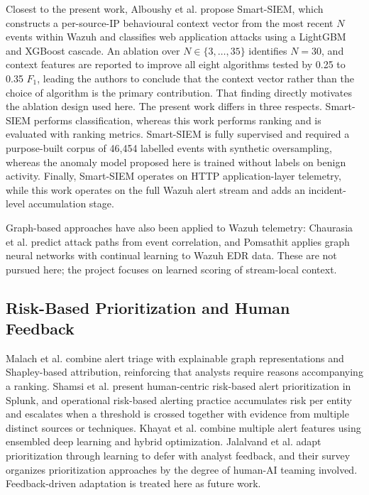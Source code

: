 \documentclass[conference]{IEEEtran}
\begin{document}
Closest to the present work, Alboushy et al. \cite{ref17} propose Smart-SIEM, which constructs a per-source-IP behavioural context vector from the most recent $N$ events within Wazuh and classifies web application attacks using a LightGBM and XGBoost cascade. An ablation over $N \in \{3,\dots,35\}$ identifies $N = 30$, and context features are reported to improve all eight algorithms tested by 0.25 to 0.35 $F_1$, leading the authors to conclude that the context vector rather than the choice of algorithm is the primary contribution. That finding directly motivates the ablation design used here. The present work differs in three respects. Smart-SIEM performs classification, whereas this work performs ranking and is evaluated with ranking metrics. Smart-SIEM is fully supervised and required a purpose-built corpus of 46{,}454 labelled events with synthetic oversampling, whereas the anomaly model proposed here is trained without labels on benign activity. Finally, Smart-SIEM operates on HTTP application-layer telemetry, while this work operates on the full Wazuh alert stream and adds an incident-level accumulation stage.

Graph-based approaches have also been applied to Wazuh telemetry: Chaurasia et al. \cite{ref4} predict attack paths from event correlation, and Pomsathit \cite{ref11} applies graph neural networks with continual learning to Wazuh EDR data. These are not pursued here; the project focuses on learned scoring of stream-local context.

\subsection{Risk-Based Prioritization and Human Feedback}

Malach et al. \cite{ref8} combine alert triage with explainable graph representations and Shapley-based attribution, reinforcing that analysts require reasons accompanying a ranking. Shamsi et al. \cite{ref9} present human-centric risk-based alert prioritization in Splunk, and operational risk-based alerting practice \cite{ref19} accumulates risk per entity and escalates when a threshold is crossed together with evidence from multiple distinct sources or techniques. Khayat et al. \cite{ref10} combine multiple alert features using ensembled deep learning and hybrid optimization. Jalalvand et al. \cite{ref18} adapt prioritization through learning to defer with analyst feedback, and their survey \cite{ref16} organizes prioritization approaches by the degree of human-AI teaming involved. Feedback-driven adaptation is treated here as future work.
\end{document}
